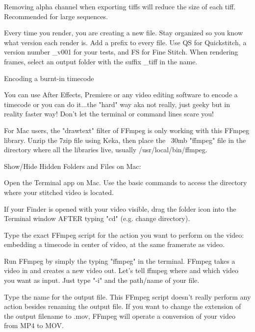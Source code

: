\begin{fullwidth}

\tip Removing alpha channel when exporting tiffs will reduce the size of each tiff. Recommended for large sequences.

Every time you render, you are creating a new file. Stay organized so you know what version each render is. Add a prefix to every file. Use QS for Quickstitch, a version number \_v001 for your tests, and FS for Fine Stitch. When rendering frames, select an output folder with the suffix  \_tiff in the name.

\clearpage
{\large Encoding a burnt-in timecode \par}

You can use After Effects, Premiere or any video editing software to encode a timecode or you can do it...the "hard" way aka not really, just geeky but in reality faster way! \textbf{} Don't let the terminal or command lines scare you!

For Mac users, the "drawtext" filter of FFmpeg is only working with this FFmpeg library. Unzip the 7zip file using Keka, then place the ~30mb "ffmpeg" file in the directory where all the libraries live, usually /usr/local/bin/ffmpeg.

Show/Hide Hidden Folders and Files on Mac:

 \par
{}

Open the Terminal app on Mac. Use the basic commands to access the directory where your stitched video is located.


\tip If your Finder is opened with your video visible, drag the folder icon into the Terminal window AFTER typing "cd" (e.g. change directory).

Type the exact FFmpeg script for the action you want to perform on the video: embedding a timecode in center of video, at the same framerate as video.

Run FFmpeg by simply the typing "ffmpeg" in the terminal. FFmpeg takes a video in and creates a new video out. Let's tell ffmpeg where and which video you want as input. Just type "-i" and the path/name of your file.


Type the name for the output file. This FFmpeg script doesn't really perform any action besides renaming the output file. If you want to change the extension of the output filename to .mov, FFmpeg will operate a conversion of your video from MP4 to MOV.


\end{fullwidth}
